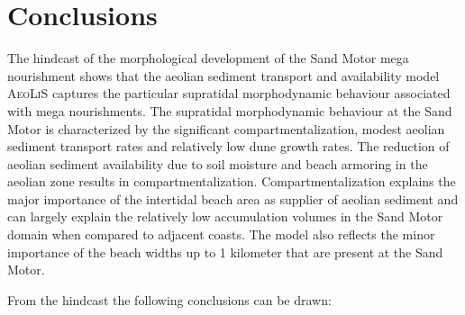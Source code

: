 





\section{Conclusions}

The hindcast of the morphological development of the Sand Motor mega
nourishment shows that the aeolian sediment transport and availability
model \textsc{AeoLiS} captures the particular supratidal morphodynamic
behaviour associated with mega nourishments. The supratidal
morphodynamic behaviour at the Sand Motor is characterized by the
significant compartmentalization, modest aeolian sediment transport
rates and relatively low dune growth rates. The reduction of aeolian
sediment availability due to soil moisture and beach armoring in the
aeolian zone results in compartmentalization.  Compartmentalization
explains the major importance of the intertidal beach area as supplier
of aeolian sediment and can largely explain the relatively low
accumulation volumes in the Sand Motor domain when compared to
adjacent coasts. The model also reflects the minor importance of the
beach widths up to 1 kilometer that are present at the Sand Motor.

\bigskip

\noindent From the hindcast the following conclusions can be drawn:

